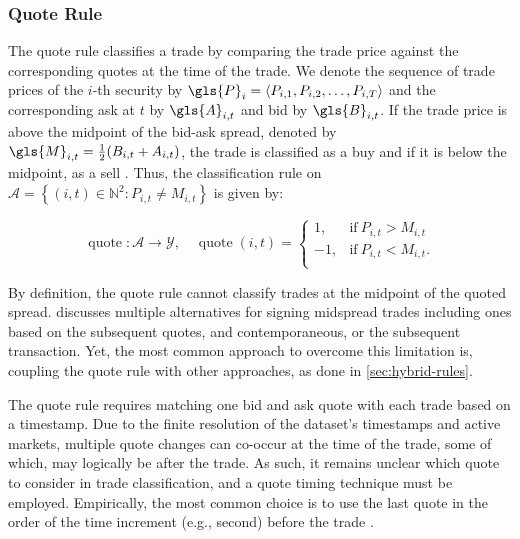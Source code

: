 \subsubsection{Quote Rule}\label{sec:quote-rule}

The quote rule classifies a trade by comparing the trade price against the corresponding quotes at the time of the trade. We denote the sequence of trade prices of the $i$-th security by $\gls{P}_i = \langle P_{i,1},P_{i,2},\dots,P_{i,T}\rangle$ and the corresponding ask at $t$ by $\gls{A}_{i,t}$ and bid by $\gls{B}_{i,t}$. If the trade price is above the midpoint of the bid-ask spread, denoted by $\gls{M}_{i,t} = \tfrac{1}{2}(B_{i,t} + A_{i,t})$, the trade is classified as a buy and if it is below the midpoint, as a sell \autocite[][41]{harrisDayEndTransactionPrice1989}. Thus, the classification rule on $\mathcal{A} = \left\{(i, t) \in \mathbb{N}^2: P_{i,t} \neq M_{i,t}\right\}$ is given by:

\begin{equation}
    \operatorname{quote}\colon \mathcal{A} \to \mathcal{Y},\quad
    \operatorname{quote}(i, t)=
    \begin{cases}
        1,  & \text{if}\ P_{i, t}>M_{i, t}  \\
        -1, & \text{if}\ P_{i, t}<M_{i, t}. \\
    \end{cases}
\end{equation}

By definition, the quote rule cannot classify trades at the midpoint of the quoted spread. \textcite[][241]{hasbrouckTradesQuotesInventories1988} discusses multiple alternatives for signing midspread trades including ones based on the subsequent quotes, and contemporaneous, or the subsequent transaction. Yet, the most common approach to overcome this limitation is, coupling the quote rule with other approaches, as done in \cref{sec:hybrid-rules}.

The quote rule requires matching one bid and ask quote with each trade based on a timestamp. Due to the finite resolution of the dataset's timestamps and active markets, multiple quote changes can co-occur at the time of the trade, some of which, may logically be after the trade. As such, it remains unclear which quote to consider in trade classification, and a quote timing technique must be employed. Empirically, the most common choice is to use the last quote in the order of the time increment (e.g., second) before the trade \autocite[][1765]{holdenLiquidityMeasurementProblems2014}.

